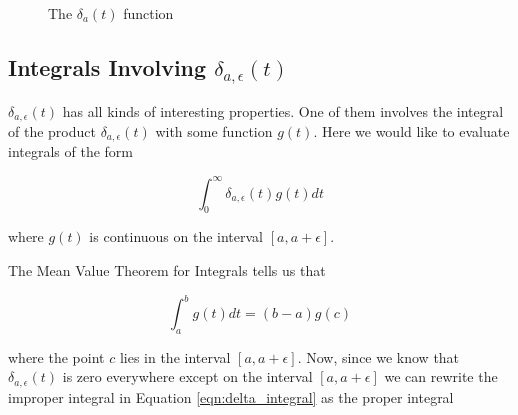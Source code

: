 \documentclass{article}
\begin{document}
\begin{figure}[H]
  \centering
  \caption{The $\delta_{a}(t)$ function}
  \label{fig:delta_limit}
\end{figure}

\subsection{Integrals Involving $\delta_{a,\epsilon}(t)$}
$\delta_{a,\epsilon}(t)$ has all kinds of interesting properties. One of them involves the integral of the product $\delta_{a,\epsilon}(t)$ with some function $g(t)$.  
Here we would like to evaluate integrals of the form

\bigskip
\begin{equation}
  \int_{0}^{\infty} \delta_{a,\epsilon}(t) g(t) dt
  \label{eqn:delta_integral}
\end{equation}

\bigskip
\noindent
where $g(t)$ is continuous on the interval $[a, a+\epsilon]$. 

\bigskip
\noindent
The Mean Value Theorem for Integrals  \cite{wiki:meam_value_theorem_for_integrals}  tells us that

\begin{equation}
  \int_{a}^{b} g(t) dt = (b -a) g(c)
  \label{eqn:mvti}
\end{equation}

\bigskip
\noindent
where the point $c$ lies in the interval $[a, a+\epsilon]$. Now, since we know that $\delta_{a,\epsilon}(t)$ is zero everywhere except on the interval
$[a, a+\epsilon]$ we can rewrite the improper integral in Equation \ref{eqn:delta_integral} as the proper integral
\end{document}
